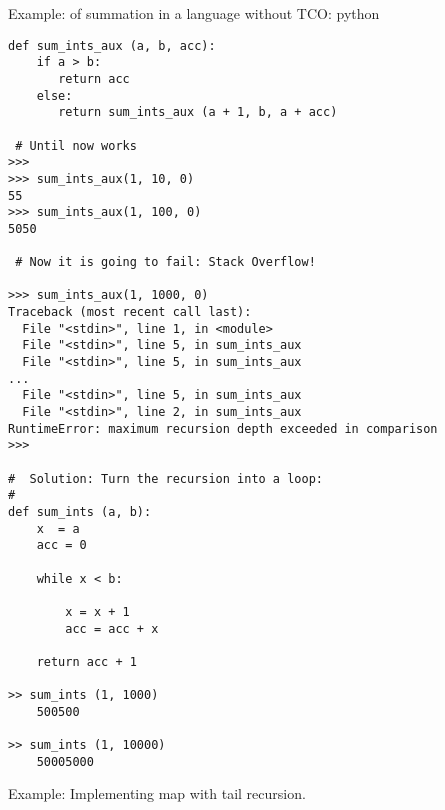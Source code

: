 \documentclass[11pt]{article}
\begin{document}
Example: of summation in a language without TCO: python  

\begin{verbatim}
def sum_ints_aux (a, b, acc):
    if a > b:
       return acc 
    else:
       return sum_ints_aux (a + 1, b, a + acc)

 # Until now works 
>>> 
>>> sum_ints_aux(1, 10, 0)
55
>>> sum_ints_aux(1, 100, 0)
5050

 # Now it is going to fail: Stack Overflow!

>>> sum_ints_aux(1, 1000, 0)
Traceback (most recent call last):
  File "<stdin>", line 1, in <module>
  File "<stdin>", line 5, in sum_ints_aux
  File "<stdin>", line 5, in sum_ints_aux
...
  File "<stdin>", line 5, in sum_ints_aux
  File "<stdin>", line 2, in sum_ints_aux
RuntimeError: maximum recursion depth exceeded in comparison
>>> 

#  Solution: Turn the recursion into a loop:
# 
def sum_ints (a, b):
    x  = a 
    acc = 0

    while x < b:

        x = x + 1
        acc = acc + x 
           
    return acc + 1
    
>> sum_ints (1, 1000)
    500500

>> sum_ints (1, 10000)
    50005000
\end{verbatim}


Example: Implementing map with tail recursion. 
\end{document}
